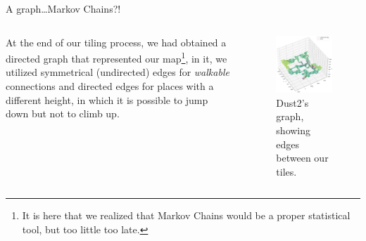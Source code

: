 \documentclass[english]{beamer}
\begin{document}
\begin{frame}{A graph\dots Markov Chains?!}
  \begin{columns}
    \begin{column}{0.55\textwidth}
      At the end of our tiling process, we had obtained a directed graph that represented our map\footnote{It is here that we realized that Markov Chains would be a proper statistical tool, but too little too late.}, in it, we utilized 
      symmetrical (undirected) edges for \emph{walkable} connections and directed edges for places with a different height, in which 
      it is possible to jump down but not to climb up.

    \end{column}
    \begin{column}{0.45\textwidth}
      \begin{figure}
        \centering
        \includegraphics[width=1\textwidth]{images/graph.png}
        \caption{Dust2's graph, showing edges between our tiles.}
        \end{figure}
    \end{column}
  \end{columns}

\end{frame}
\end{document}
